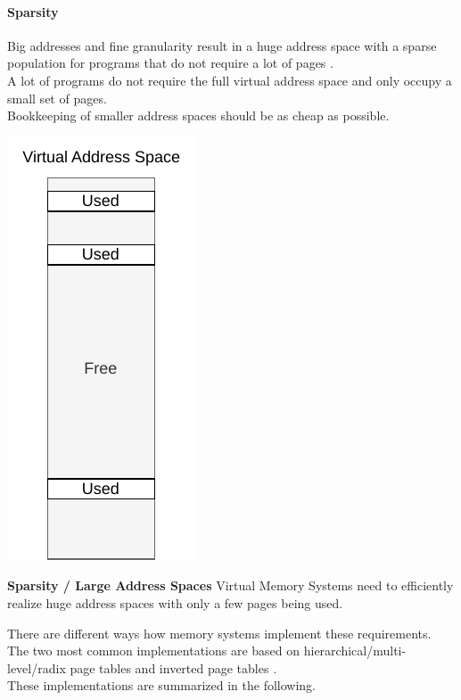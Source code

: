 \paragraph{Sparsity} Big addresses and fine granularity result in a huge address
space with a sparse population for programs that do not require a lot of pages
\cite{tanenbaumOS}.\\
A lot of programs do not require the full virtual address space and only occupy a small set of pages.\\
Bookkeeping of smaller address spaces should be as cheap as possible.

\begin{marginfigure}
    \centering
    \includegraphics*[width=0.5\marginparwidth]{figures/fund_sparsity.pdf}
    \caption{\textbf{Sparsity / Large Address Spaces} Virtual Memory Systems need to efficiently
        realize huge address spaces with only a few pages being used.}
\end{marginfigure}


There are different ways how memory systems implement these requirements.\\
The two most common implementations are based on hierarchical/multi-level/radix
\cite{jacob1998virtualissues,yaniv2016hash,tanenbaumOS} page tables and inverted page tables \cite{jacob1998look,jacob1998virtualissues}.\\
These implementations are summarized in the following.




